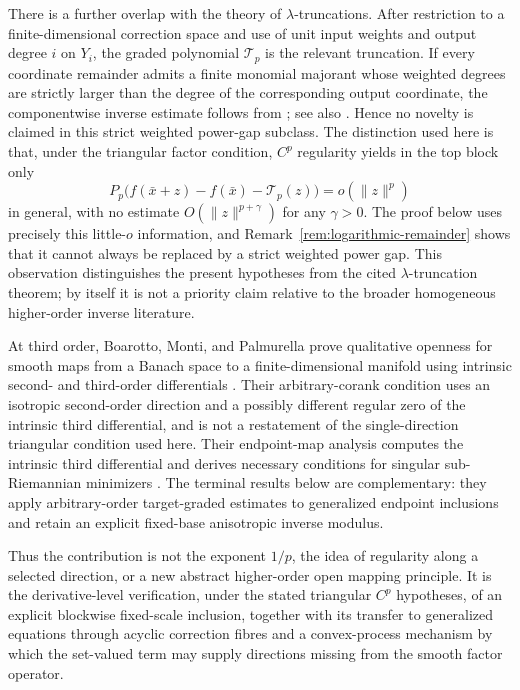 \documentclass[11pt]{amsart}
\theoremstyle{definition}
\theoremstyle{remark}
\newcommand{\bx}{\bar x}
\begin{document}
	There is a further overlap with the theory of $\lambda$-truncations.
	After restriction to a finite-dimensional correction space and use of
	unit input weights and output degree $i$ on $Y_i$, the graded polynomial
	$\mathcal T_p$ is the relevant truncation. If every coordinate remainder
	admits a finite monomial majorant whose weighted degrees are strictly
	larger than the degree of the corresponding output coordinate, the
	componentwise inverse estimate follows from
	\cite[Theorem~3.2]{ArutyunovZhukovskiySbornik2025}; see also
	\cite{ArutyunovZhukovskiyMathNotes2025}. Hence no novelty is claimed in
	this strict weighted power-gap subclass. The distinction used here is
	that, under the triangular factor condition, $C^p$ regularity yields in the
	top block only
	$$
	P_p\bigl(f(\bx+z)-f(\bx)-\mathcal T_p(z)\bigr)=o(\|z\|^p)
	$$
	in general, with no estimate $O(\|z\|^{p+\gamma})$ for any
	$\gamma>0$. The proof below uses precisely this little-$o$ information,
	and Remark~\ref{rem:logarithmic-remainder} shows that it cannot always be
	replaced by a strict weighted power gap. This observation distinguishes the present
	hypotheses from the cited $\lambda$-truncation theorem; by itself it is
	not a priority claim relative to the broader homogeneous higher-order
	inverse literature.
	
	At third order, Boarotto, Monti, and Palmurella prove qualitative
	openness for smooth maps from a Banach space to a finite-dimensional
	manifold using intrinsic second- and third-order differentials
	\cite[Theorem~1.1]{BoarottoMontiPalmurella}. Their arbitrary-corank
	condition uses an isotropic second-order direction and a possibly
	different regular zero of the intrinsic third differential, and is not a
	restatement of the single-direction triangular condition used here. Their
	endpoint-map analysis computes the intrinsic third differential and
	derives necessary conditions for singular sub-Riemannian minimizers
	\cite[Theorem~1.2 and Proposition~3.5]{BoarottoMontiPalmurella}. The
	terminal results below are complementary: they apply arbitrary-order
	target-graded estimates to generalized endpoint inclusions and retain an
	explicit fixed-base anisotropic inverse modulus.
	
	Thus the contribution is not the exponent $1/p$, the idea of regularity
	along a selected direction, or a new abstract higher-order open mapping
	principle. It is the derivative-level verification, under the stated
	triangular $C^p$ hypotheses, of an explicit blockwise fixed-scale
	inclusion, together with its transfer to generalized equations through
	acyclic correction fibres and a convex-process mechanism by which the
	set-valued term may supply directions missing from the smooth factor
	operator.
	
\end{document}
